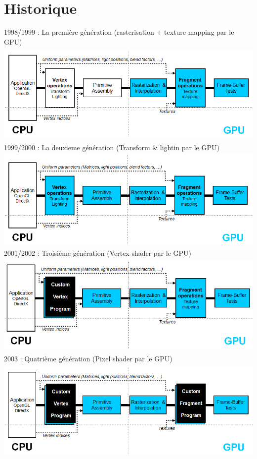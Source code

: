\section{Historique}
1998/1999 : La première génération (rasterisation + texture mapping par le GPU) \\
\includegraphics[width=14cm,height=50mm]{leo/images/pipeline1.png} 
1999/2000 : La deuxieme génération (Transform \& lightin par le GPU)\\
\includegraphics[width=14cm,height=50mm]{leo/images/pipeline2.png} 
2001/2002 : Troisième génération (Vertex shader par le GPU)\\
\includegraphics[width=14cm,height=50mm]{leo/images/pipeline3.png} 
2003 : Quatrième génération (Pixel shader par le GPU)\\
\includegraphics[width=14cm,height=50mm]{leo/images/pipeline4.png} 

